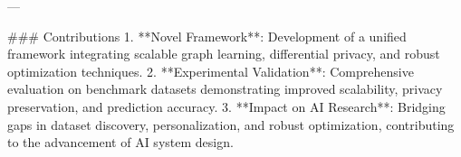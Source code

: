 ---

### Contributions
1. **Novel Framework**: Development of a unified framework integrating scalable graph learning, differential privacy, and robust optimization techniques.
2. **Experimental Validation**: Comprehensive evaluation on benchmark datasets demonstrating improved scalability, privacy preservation, and prediction accuracy.
3. **Impact on AI Research**: Bridging gaps in dataset discovery, personalization, and robust optimization, contributing to the advancement of AI system design.

